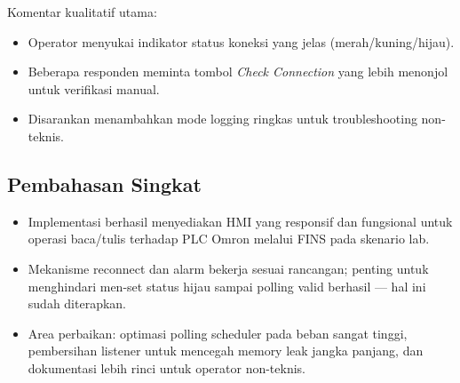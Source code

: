 Komentar kualitatif utama:
\begin{itemize}
    \item Operator menyukai indikator status koneksi yang jelas (merah/kuning/hijau).
    \item Beberapa responden meminta tombol \textit{Check Connection} yang lebih menonjol untuk verifikasi manual.
    \item Disarankan menambahkan mode logging ringkas untuk troubleshooting non-teknis.
\end{itemize}

\subsection{Pembahasan Singkat}
\begin{itemize}
    \item Implementasi berhasil menyediakan HMI yang responsif dan fungsional untuk operasi baca/tulis terhadap PLC Omron melalui FINS pada skenario lab.
    \item Mekanisme reconnect dan alarm bekerja sesuai rancangan; penting untuk menghindari men-set status hijau sampai polling valid berhasil — hal ini sudah diterapkan.
    \item Area perbaikan: optimasi polling scheduler pada beban sangat tinggi, pembersihan listener untuk mencegah memory leak jangka panjang, dan dokumentasi lebih rinci untuk operator non-teknis.
\end{itemize}
\cleardoublepage

